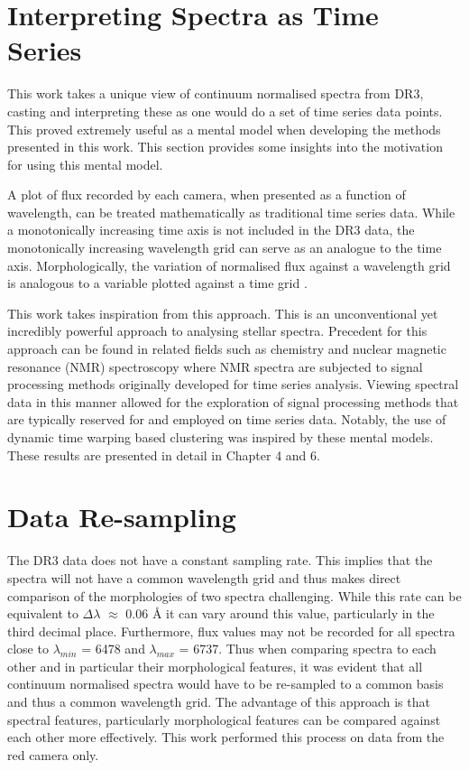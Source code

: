 \section{Interpreting Spectra as Time Series}

This work takes a unique view of continuum normalised spectra from DR3, casting and interpreting these as one would do a set of time series data points. This proved extremely useful as a mental model when developing the methods presented in this work. This section provides some insights into the motivation for using this mental model. 

A plot of flux recorded by each camera, when presented as a function of wavelength, can be treated mathematically as traditional time series data. While a monotonically increasing time axis is not included in the DR3 data, the monotonically increasing wavelength grid can serve as an analogue to the time axis. Morphologically, the variation of normalised flux against a wavelength grid is analogous to a variable plotted against a time grid \cite{nielsen2019practical}.

This work takes inspiration from this approach. This is an unconventional yet incredibly powerful approach to analysing stellar spectra. Precedent for this approach can be found in related fields such as chemistry and nuclear magnetic resonance (NMR) spectroscopy where NMR spectra are subjected to signal processing methods originally developed for time series analysis\cite{nielsen2019practical}. Viewing spectral data in this manner allowed for the exploration of signal processing methods that are typically reserved for and employed on time series data. Notably, the use of dynamic time warping based clustering was inspired by these mental models. These results are presented in detail in Chapter 4 and 6.

\section{Data Re-sampling}

The DR3 data does not have a constant sampling rate. This implies that the spectra will not have a common wavelength grid and thus makes direct comparison of the morphologies of two spectra challenging. While this rate can be equivalent to $\Delta\lambda$ $\approx$ 0.06 \r{A}\cite{vcotar2021galah} it can vary around this value, particularly in the third decimal place. Furthermore, flux values may not be recorded for all spectra close to $\lambda_{min}$ = 6478 and $\lambda_{max}$ = 6737. Thus when comparing spectra to each other and in particular their morphological features, it was evident that all continuum normalised spectra would have to be re-sampled to a common basis and thus a common wavelength grid. The advantage of this approach is that spectral features, particularly morphological features can be compared against each other more effectively. This work performed this process on data from the red camera only. 

